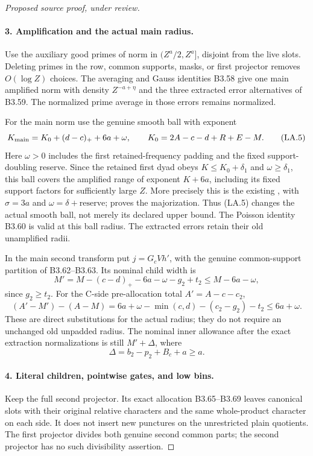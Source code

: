 \begin{proof}[Proposed source proof, under review]
\paragraph{3. Amplification and the actual main radius.}
Use the auxiliary good primes of norm in $(Z^a/2,Z^a]$, disjoint from
the live slots. Deleting primes in the row, common supports, masks,
or first projector removes $O(\log Z)$ choices. The averaging and
Gauss identities B3.58 give one main amplified norm with density
$Z^{-a+\eta}$ and the three extracted error alternatives of B3.59.
The normalized prime average in those errors remains normalized.

For the main norm use the genuine smooth ball with exponent
\[
 K_{\rm main}=K_0+(d-c)_++6a+\omega,\qquad
 K_0=2A-c-d+R+E-M.
 \tag{LA.5}
\]
Here $\omega>0$ includes the first retained-frequency padding and
the fixed support-doubling reserve. Since the retained first dyad
obeys $K\le K_0+\delta_1$ and $\omega\ge\delta_1$, this ball
covers the amplified range of exponent $K+6a$, including its fixed
support factors for sufficiently large $Z$. More precisely this is
the existing , with $\sigma=3a$ and
$\omega=\delta+\mathrm{reserve}$; 
proves the majorization. Thus (LA.5) changes the actual smooth ball,
not merely its declared upper bound. The Poisson identity B3.60 is
valid at this ball radius. The extracted errors retain their old
unamplified radii.

In the main second transform put $j=G_cVh'$, with the genuine
common-support partition of B3.62--B3.63. Its nominal child width is
\[
 M'=M-(c-d)_+-6a-\omega-g_2+t_2\le M-6a-\omega,
 \tag{LA.6}
\]
since $g_2\ge t_2$. For the C-side pre-allocation total
$A'=A-c-c_2$,
\[
 (A'-M')-(A-M)
 =6a+\omega-\min(c,d)-(c_2-g_2)-t_2\le6a+\omega.
 \tag{LA.7}
\]
These are direct substitutions for the actual radius; they do not
require an unchanged old unpadded radius. The nominal inner allowance
after the exact extraction normalizations is still
$M'+\Delta$, where
\[
 \Delta=b_2-p_2+B_c+a\ge a.
 \tag{LA.8}
\]

\paragraph{4. Literal children, pointwise gates, and low bins.}
Keep the full second projector. Its exact allocation B3.65--B3.69
leaves canonical slots with their original relative characters and
the same whole-product character on each side. It does not insert
new punctures on the unrestricted plain quotients. The first projector
divides both genuine second common parts; the second projector has
no such divisibility assertion.


\end{proof}
